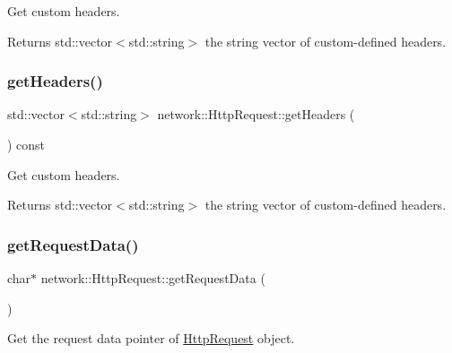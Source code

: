 Get custom headers.

\begin{DoxyReturn}{Returns}
std\+::vector$<$std\+::string$>$ the string vector of custom-\/defined headers. 
\end{DoxyReturn}
\mbox{\label{classnetwork_1_1HttpRequest_a3555ebc2bb79d38bf80a36ab9d979e6a}} 
\subsubsection{\texorpdfstring{get\+Headers()}{getHeaders()}\hspace{0.1cm}{\footnotesize\ttfamily [2/2]}}
{\footnotesize\ttfamily std\+::vector$<$std\+::string$>$ network\+::\+Http\+Request\+::get\+Headers (\begin{DoxyParamCaption}{ }\end{DoxyParamCaption}) const\hspace{0.3cm}{\ttfamily [inline]}}

Get custom headers.

\begin{DoxyReturn}{Returns}
std\+::vector$<$std\+::string$>$ the string vector of custom-\/defined headers. 
\end{DoxyReturn}
\mbox{\label{classnetwork_1_1HttpRequest_a13f6e9e055afd00d0f5ff3be2d791858}} 
\subsubsection{\texorpdfstring{get\+Request\+Data()}{getRequestData()}\hspace{0.1cm}{\footnotesize\ttfamily [1/2]}}
{\footnotesize\ttfamily char$\ast$ network\+::\+Http\+Request\+::get\+Request\+Data (\begin{DoxyParamCaption}{ }\end{DoxyParamCaption})\hspace{0.3cm}{\ttfamily [inline]}}

Get the request data pointer of \hyperlink{classnetwork_1_1HttpRequest}{Http\+Request} object.

